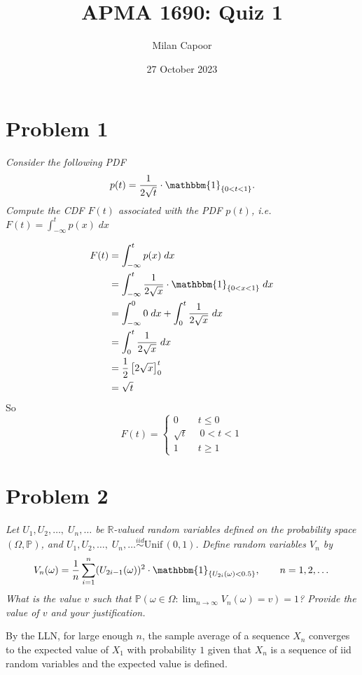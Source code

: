 \documentclass[12pt]{article}
\title{APMA 1690: Quiz 1}
\author{Milan Capoor}
\date{27 October 2023}
\renewcommand{\P}{\mathbb{P}}
\newcommand{\R}{\mathbb{R}}
\newcommand{\ind}{\mathbbm{1}}
\newcommand{\Unif}{\text{Unif}\,}
\begin{document}
\maketitle

\section*{Problem 1}
\emph{Consider the following PDF}
\[p(t) = \frac{1}{2\sqrt t} \cdot \ind_{\{0 < t < 1\}}.\]
\emph{Compute the CDF $F(t)$ associated with the PDF $p(t)$, i.e. $F(t) = \int_{-\infty}^t p(x)\; dx$}

    \color{blue}
        \begin{align*}
            F(t) &= \int_{-\infty}^t p(x)\; dx\\
            &= \int_{-\infty}^t \frac{1}{2\sqrt x} \cdot \ind_{\{0 < x < 1\}} \; dx\\
            &= \int_{-\infty}^0 0 \; dx + \int_0^t \frac{1}{2\sqrt x} \; dx \\
            &= \int_0^t \frac{1}{2\sqrt x} \; dx\\
            &= \frac{1}{2}\left[2\sqrt x\right]_0^t\\
            &= \sqrt{t}
        \end{align*}
        So 
        \[\boxed{F(t) = \begin{cases}
            0 \qquad t \leq 0\\
            \sqrt{t} \quad\; 0 < t < 1\\
            1 \qquad t \geq 1
        \end{cases}}\]
    \color{black}
\pagebreak

\section*{Problem 2}
\emph{Let $U_1, U_2, \dots,\; U_n, \dots$ be $\R$-valued random variables defined on the probability space $(\Omega, \P)$, and $U_1, U_2, \dots,\; U_n, \dots \overset{iid}{\sim} \Unif(0, 1)$. Define random variables $V_n$ by}
    \[V_n(\omega) = \frac{1}{n}\sum_{i=1}^n (U_{2i-1}(\omega))^2 \cdot \ind_{\{U_{2i}(\omega) < 0.5\}}, \qquad n = 1, 2, \dots\]
\emph{What is the value $v$ such that $\P(\omega \in \Omega: \lim_{n\to\infty} V_n(\omega) = v) = 1$? Provide the value of $v$ and your justification.}

    \color{blue} 
        By the LLN, for large enough $n$, the sample average of a sequence $X_n$ converges to the expected value of $X_1$ with probability $1$ given that $X_n$ is a sequence of iid random variables and the expected value is defined. 
\end{document}
